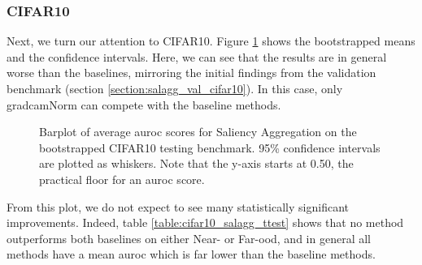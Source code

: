 \documentclass[UKenglish]{uiomasterthesis} %
\theoremstyle{definition}
\begin{document}
\newpage

\subsubsection{CIFAR10}

Next, we turn our attention to CIFAR10. Figure \ref{fig:cifar10_salagg_bootstrap_barplot} shows the bootstrapped means and the confidence intervals. Here, we can see that the results are in general worse than the baselines, mirroring the initial findings from the validation benchmark (section \ref{section:salagg_val_cifar10}). In this case, only \ac{gradcam}Norm can compete with the baseline methods.

\begin{figure}[hbtp]
    \begin{center}
        
    \end{center}
    \caption[CIFAR10 Saliency Aggregation Bootstrap]{Barplot of average \ac{auroc} scores for Saliency Aggregation on the bootstrapped CIFAR10 testing benchmark. 95\% confidence intervals are plotted as whiskers. Note that the y-axis starts at 0.50, the practical floor for an \ac{auroc} score.}
    \label{fig:cifar10_salagg_bootstrap_barplot}
\end{figure}

From this plot, we do not expect to see many statistically significant improvements. Indeed, table \ref{table:cifar10_salagg_ttest} shows that no method outperforms both baselines on either Near- or Far-\ac{ood}, and in general all methods have a mean \ac{auroc} which is far lower than the baseline methods.
\end{document}
